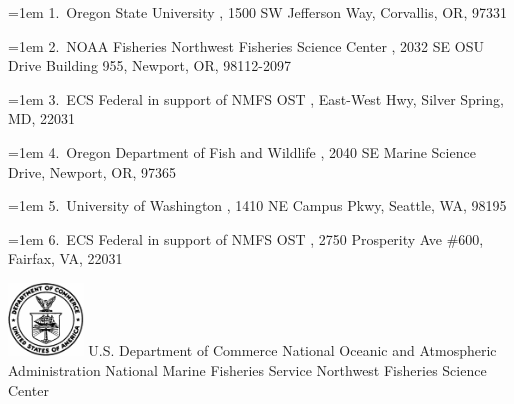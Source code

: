 \documentclass[
]{scrartcl}
\begin{document}
\begin{titlepage}
\begin{minipage}[b][\textheight][s]{\textwidth}

  \vspace{2\baselineskip}

  \hangindent=1em
  {1}.~{Oregon State University}%
  , %
  {1500 SW Jefferson Way, Corvallis, OR, 97331}%
  \par\hangindent=1em%
  {2}.~{NOAA Fisheries Northwest Fisheries Science Center}%
  , %
  {2032 SE OSU Drive Building 955, Newport, OR, 98112-2097}%
  \par\hangindent=1em%
  {3}.~{ECS Federal in support of NMFS OST}%
  , %
  {East-West Hwy, Silver Spring, MD, 22031}%
  \par\hangindent=1em%
  {4}.~{Oregon Department of Fish and Wildlife}%
  , %
  {2040 SE Marine Science Drive, Newport, OR, 97365}%
  \par\hangindent=1em%
  {5}.~{University of Washington}%
  , %
  {1410 NE Campus Pkwy, Seattle, WA, 98195}%
  \par\hangindent=1em%
  {6}.~{ECS Federal in support of NMFS OST}%
  , %
  {2750 Prosperity Ave \#600, Fairfax, VA, 22031}%


  \vspace{1\baselineskip}



  \vfill


  \vspace{1\baselineskip}

  \includegraphics[alt={},width=2cm]{support_files/us_doc_logo.png}\newline %
  U.S. Department of Commerce\newline
  National Oceanic and Atmospheric Administration\newline
  National Marine Fisheries Service\newline
  Northwest Fisheries Science Center\newline


\end{minipage}
\end{titlepage}
\end{document}
